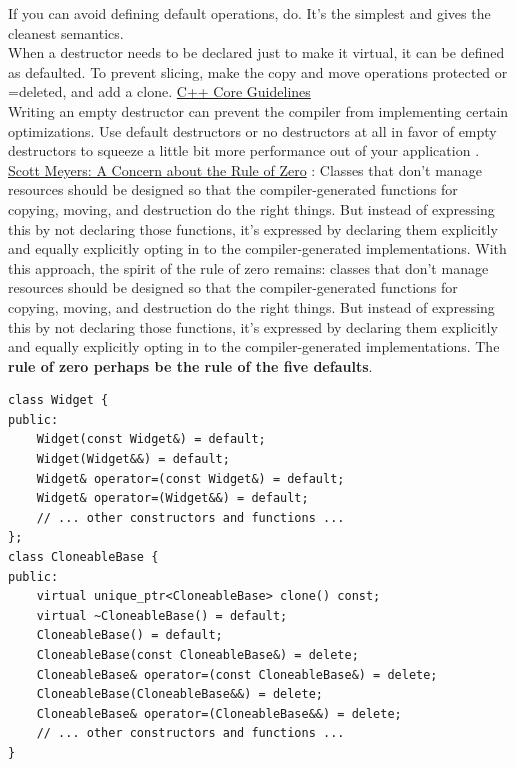 \documentclass[a4paper,12pt,notitlepage]{article}
\begin{document}
\noindent
If you can avoid defining default operations, do. It's the simplest and gives the cleanest
semantics.\\

\noindent
When a destructor needs to be declared just to make it virtual, it can be defined as defaulted. To prevent
slicing, make the copy and move operations protected or =deleted, and add a clone. \href{https://isocpp.github.io/CppCoreGuidelines/CppCoreGuidelines#cdefop-default-operations}{C++ Core Guidelines}\\

\noindent
Writing an empty destructor can prevent the compiler from implementing certain optimizations. Use
default destructors or no destructors at all in favor of empty destructors to squeeze a little bit
more performance out of your application \cite{High_perf_cpp}.\\

\noindent
\href{https://scottmeyers.blogspot.com/2014/03/a-concern-about-rule-of-zero.html}{Scott Meyers: A Concern about the Rule of Zero}
: Classes that don't manage resources should be designed so that the compiler-generated functions
for copying, moving, and destruction do the right things. But instead of expressing this by not
declaring those functions, it's expressed by declaring them explicitly and equally explicitly opting
in to the compiler-generated implementations. With this approach, the spirit of the rule of zero
remains: classes that don't manage resources should be designed so that the compiler-generated
functions for copying, moving, and destruction do the right things. But instead of expressing this
by not declaring those functions, it's expressed by declaring them explicitly and equally explicitly
opting in to the compiler-generated implementations. The \textbf{rule of zero perhaps be the rule of the
five defaults}.

\begin{verbatim}
class Widget {
public:
    Widget(const Widget&) = default;
    Widget(Widget&&) = default;
    Widget& operator=(const Widget&) = default;
    Widget& operator=(Widget&&) = default;
    // ... other constructors and functions ...
};
class CloneableBase {
public:
    virtual unique_ptr<CloneableBase> clone() const;
    virtual ~CloneableBase() = default;
    CloneableBase() = default;
    CloneableBase(const CloneableBase&) = delete;
    CloneableBase& operator=(const CloneableBase&) = delete;
    CloneableBase(CloneableBase&&) = delete;
    CloneableBase& operator=(CloneableBase&&) = delete;
    // ... other constructors and functions ...
}
\end{verbatim}
\end{document}
